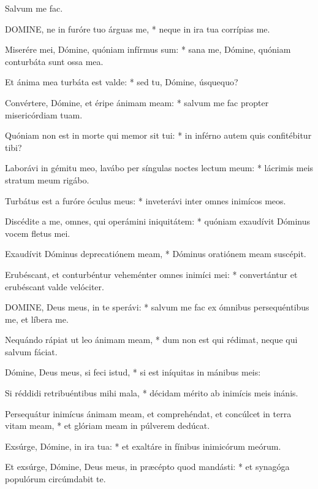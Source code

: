  Salvum me fac.



\lettrine[lines=2]{D}{OMINE}, ne in furóre tuo árguas me, * neque in ira tua corrípias me.

Miserére mei, Dómine, quóniam infírmus sum: * sana me, Dómine, quóniam conturbáta sunt ossa mea.

Et ánima mea turbáta est valde: * sed tu, Dómine, úsquequo?

Convértere, Dómine, et éripe ánimam meam: * salvum me fac propter misericórdiam tuam.

Quóniam non est in morte qui memor sit tui: * in inférno autem quis confitébitur tibi?

Laborávi in gémitu meo, lavábo per síngulas noctes lectum meum: * lácrimis meis stratum meum rigábo.

Turbátus est a furóre óculus meus: * inveterávi inter omnes inimícos meos.

Discédite a me, omnes, qui operámini iniquitátem: * quóniam exaudívit Dóminus vocem fletus mei.

Exaudívit Dóminus deprecatiónem meam, * Dóminus oratiónem meam suscépit.

Erubéscant, et conturbéntur veheménter omnes inimíci mei: * convertántur et erubéscant valde velóciter.


\lettrine[lines=2]{D}{OMINE}, Deus meus, in te sperávi: * salvum me fac ex ómnibus persequéntibus me, et líbera me.

Nequándo rápiat ut leo ánimam meam, * dum non est qui rédimat, neque qui salvum fáciat.

Dómine, Deus meus, si feci istud, * si est iníquitas in mánibus meis:

Si réddidi retribuéntibus mihi mala, * décidam mérito ab inimícis meis inánis.

Persequátur inimícus ánimam meam, et comprehéndat, et concúlcet in terra vitam meam, * et glóriam meam in púlverem dedúcat.

Exsúrge, Dómine, in ira tua: * et exaltáre in fínibus inimicórum meórum.

Et exsúrge, Dómine, Deus meus, in præcépto quod mandásti: * et synagóga populórum circúmdabit te.

